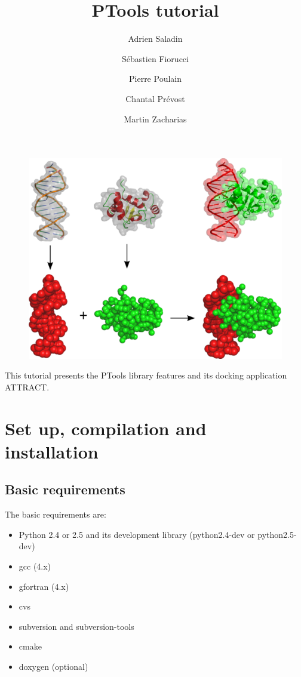 \documentclass[12pt,a4paper]{article}
\begin{document}
\title{\bf PTools tutorial}
\author{
Adrien Saladin \and 
S\'ebastien Fiorucci \and
Pierre Poulain \and
Chantal Pr\'evost \and
Martin Zacharias
}

\maketitle

\thispagestyle{empty}

\begin{figure}[htbp]
\center
\includegraphics*[width=0.80\linewidth]{img/docking.png}
\end{figure}


\vspace*{3cm}

\noindent
This tutorial presents the PTools library features and its docking application ATTRACT.

\newpage

\tableofcontents{}

\newpage

\section{Set up, compilation and installation}

\subsection{Basic requirements}

The basic requirements are:
\begin{itemize}
\item Python 2.4 or 2.5 and its development library (python2.4-dev or python2.5-dev)
\item gcc (4.x)
\item gfortran (4.x)
\item cvs
\item subversion and subversion-tools
\item cmake
\item doxygen (optional)
\end{itemize}
\end{document}
